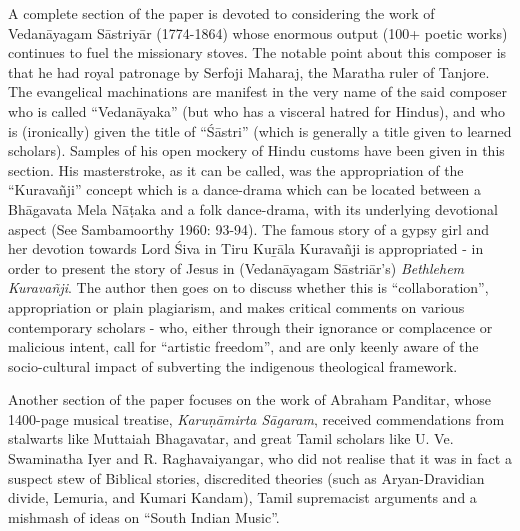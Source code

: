 A complete section of the paper is devoted to considering the work of Vedanāyagam Sāstriyār (1774-1864) whose enormous output (100+ poetic works) continues to fuel the missionary stoves. The notable point about this composer is that he had royal patronage by Serfoji Maharaj, the Maratha ruler of Tanjore. The evangelical machinations are manifest in the very name of the said composer who is called “Vedanāyaka” (but who has a visceral hatred for Hindus), and who is (ironically) given the title of “Śāstri” (which is generally a title given to learned scholars). Samples of his open mockery of Hindu customs have been given in this section. His masterstroke, as it can be called, was the appropriation of the “Kuravañji” concept which is a dance-drama which can be located between a Bhāgavata Mela Nāṭaka and a folk dance-drama, with its underlying devotional aspect (See Sambamoorthy 1960: 93-94). The famous story of a gypsy girl and her devotion towards Lord Śiva in Tiru Kuṟāla Kuravañji is appropriated - in order to present the story of Jesus in (Vedanāyagam Sāstriār’s) \textit{Bethlehem Kuravañji}. The author then goes on to discuss whether this is “collaboration”, appropriation or plain plagiarism, and makes critical comments on various contemporary scholars - who, either through their ignorance or complacence or malicious intent, call for “artistic freedom”, and are only keenly aware of the socio-cultural impact of subverting the indigenous theological framework.

Another section of the paper focuses on the work of Abraham Panditar, whose 1400-page musical treatise, \textit{Karuṇāmirta Sāgaram}, received commendations from stalwarts like Muttaiah Bhagavatar, and great Tamil scholars like U. Ve. Swaminatha Iyer and R. Raghavaiyangar, who did not realise that it was in fact a suspect stew of Biblical stories, discredited theories (such as Aryan-Dravidian divide, Lemuria, and Kumari Kandam), Tamil supremacist arguments and a mishmash of ideas on “South Indian Music”.

